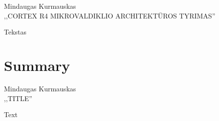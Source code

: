 \documentclass[a4paper, 12pt]{article} %
\newcommand{\studentas}{Mindaugas Kurmauskas} %
\newcommand{\pavadinimas}{Cortex R4 mikrovaldiklio architekt\={u}ros tyrimas} %
\begin{document}

\begin{onehalfspacing}

\begin{center}

\studentas \\[12pt]

\MakeUppercase{,,\pavadinimas''}\\

\end{center}

Tekstas

\newpage

\section*{Summary}


\begin{center}

\studentas \\[12pt]

\MakeUppercase{,,Title''}\\


\end{center}

Text

\end{onehalfspacing}
\end{document}
